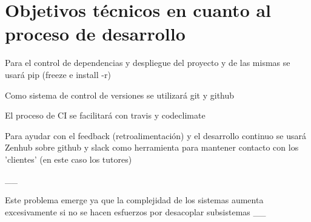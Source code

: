 \section{Objetivos técnicos en cuanto al proceso de desarrollo}
\begin{list}{-}{}
\item Para el control de dependencias y despliegue del proyecto y de las mismas se usará pip (freeze e install -r)
\item Como sistema de control de versiones se utilizará git y github
\item El proceso de CI se facilitará con travis y codeclimate
\item Para ayudar con el feedback (retroalimentación) y el desarrollo continuo se usará Zenhub sobre github y slack como herramienta para mantener contacto con los 'clientes' (en este caso los tutores)
\end{list}

__

 Este problema emerge ya que la complejidad de los sistemas aumenta excesivamente si no se hacen esfuerzos por desacoplar subsistemas
__